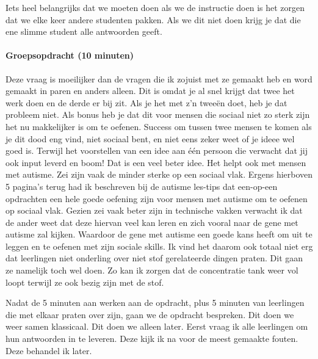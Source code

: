                     \bigskip
                    
                    \noindent Iets heel belangrijks dat we moeten doen als we de instructie doen is het zorgen dat we elke keer andere studenten pakken. Als we dit niet doen krijg je dat die ene slimme student alle antwoorden geeft. 
                    
                \paragraph{Groepsopdracht (10 minuten)}
                    Deze vraag is moeilijker dan de vragen die ik zojuist met ze gemaakt heb en word gemaakt in paren en anders alleen. Dit is omdat je al snel krijgt dat twee het werk doen en de derde er bij zit. Als je het met z'n tweeën doet, heb je dat probleem niet. Als bonus heb je dat dit voor mensen die sociaal niet zo sterk zijn het nu makkelijker is om te oefenen. Success om tussen twee mensen te komen als je dit dood eng vind, niet sociaal bent, en niet eens zeker weet of je ideee wel goed is. Terwijl het voorstellen van een idee aan één persoon die verwacht dat jij ook input leverd en boom! Dat is een veel beter idee. Het helpt ook met mensen met autisme. Zei zijn vaak de minder sterke op een sociaal vlak. Ergens hierboven 5 pagina's terug had ik beschreven bij de autisme les-tips dat een-op-een opdrachten een hele goede oefening zijn voor mensen met autisme om te oefenen op sociaal vlak. Gezien zei vaak beter zijn in technische vakken verwacht ik dat de ander weet dat deze hiervan veel kan leren en zich vooral naar de gene met autisme zal kijken. Waardoor de gene met autisme een goede kans heeft om uit te leggen en te oefenen met zijn sociale skills. Ik vind het daarom ook totaal niet erg dat leerlingen niet onderling over niet stof gerelateerde dingen praten. Dit gaan ze namelijk toch wel doen. Zo kan ik zorgen dat de concentratie tank weer vol loopt terwijl ze ook bezig zijn met de stof.

                    \bigskip

                    \noindent Nadat de 5 minuten aan werken aan de opdracht, plus 5 minuten van leerlingen die met elkaar praten over zijn, gaan we de opdracht bespreken. Dit doen we weer samen klassicaal. Dit doen we alleen later. Eerst vraag ik alle leerlingen om hun antwoorden in te  leveren. Deze kijk ik na voor de meest gemaakte fouten. Deze behandel ik later.
                    
                    \bigskip

